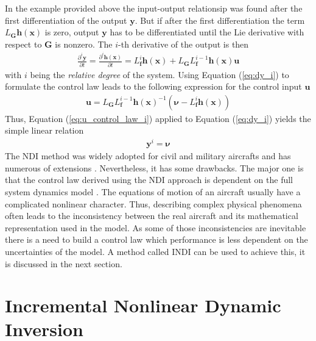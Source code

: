 \documentclass[11pt, a4paper, twoside]{report}
\begin{document}
In the example provided above the input-output relationsip was found after the first differentiation of the output $\bm{y}$. But if after the first differentiation the term $L_{\bm{G}}\bm{h}(\bm{x})$ is zero, output $\bm{y}$ has to be differentiated until the Lie derivative with respect to $\bm{G}$ is nonzero. The $i$-th derivative of the output is then
\begin{equation}
	\begin{split}
		\frac{\partial^i\bm{y}}{\partial t} = \frac{\partial^i\bm{h}(\bm{x})}{\partial t} = L_{\bm{f}}^i \bm{h}(\bm{x}) + L_{\bm{G}} L_{\bm{f}}^{i-1} \bm{h}(\bm{x}) \bm{u}
		\label{eq:dy_i}
	\end{split}
\end{equation}
with $i$ being the \textit{relative degree} of the system. Using Equation (\ref{eq:dy_i}) to formulate the control law leads to the following expression for the control input $\bm{u}$
\begin{equation}
	\begin{split}
		\bm{u} = L_{\bm{G}} L_{\bm{f}}^{i-1} \bm{h}(\bm{x})^{-1} (\bm{\nu} - L_{\bm{f}}^i\bm{h}(\bm{x})) 
		\label{eq:u_control_law_i}
	\end{split}
\end{equation}
Thus, Equation (\ref{eq:u_control_law_i}) applied to Equation (\ref{eq:dy_i}) yields the simple linear relation
\begin{equation}
	\begin{split}
		\bm{y}^i = \bm{\nu}
		\label{eq:lin_relation}
	\end{split}
\end{equation}
The \acrshort{NDI} method was widely adopted for civil and military aircrafts and has numerous of extensions \cite{Horn}. Nevertheless, it has some drawbacks. The major one is that the control law derived using the \acrshort{NDI} approach is dependent on the full system dynamics model \cite{Sieberling}. The equations of motion of an aircraft usually have a complicated nonlinear character. Thus, describing complex physical phenomena often leads to the inconsistency between the real aircraft and its mathematical representation used in the model. As some of those inconsistencies are inevitable there is a need to build a control law which performance is less dependent on the uncertainties of the model. A method called \acrfull{INDI} can be used to achieve this, it is discussed in the next section.

\section{Incremental Nonlinear Dynamic Inversion} \label{sec:indi}
\end{document}
